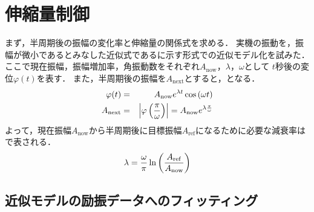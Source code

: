           \section{伸縮量制御}

          まず，半周期後の振幅の変化率と伸縮量の関係式を求める．
          実機の振動を，振幅が微小であるとみなした近似式であるに示す形式での近似モデル化を試みた．
          ここで現在振幅，振幅増加率，角振動数をそれぞれ$A_{\mathrm{now}}$，$\lambda$，$\omega$として
          $t$秒後の変位$\varphi(t)$を表す．
          また，半周期後の振幅を$A_{\mathrm{next}}$とすると，となる．
          \begin{eqnarray}
            \equlabel{Approximation Model}
            \varphi(t)&=&A_{\mathrm{now}}e^{\lambda t}\cos{(\omega t)}\\
            \equlabel{amp rate}
            A_{\mathrm{next}}&=&\left|\varphi\left(\frac{\pi}{\omega}\right)\right|=A_{\mathrm{now}}e^{\lambda \frac{\pi}{\omega}}
          \end{eqnarray}
          よって，現在振幅$A_{\mathrm{now}}$から半周期後に目標振幅$A_{\mathrm{ref}}$になるために必要な減衰率はで表される．
          \begin{eqnarray}
            \equlabel{lambda}
            \lambda=\frac{\omega}{\pi}\ln{\left(\frac{A_{\mathrm{ref}}}{A_{\mathrm{now}}}\right)}
          \end{eqnarray}

        \subsection{近似モデルの励振データへのフィッティング}
          

